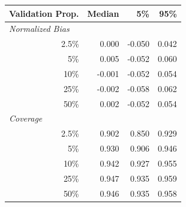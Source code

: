 
\begin{tabular}{r|rrr}
\toprule
Validation Prop. & Median & 5\% & 95\%\\
\midrule
\multicolumn{1}{l|}{\textit{Normalized Bias}}\\
2.5\% & 0.000 & -0.050 & 0.042\\
5\% & 0.005 & -0.052 & 0.060\\
10\% & -0.001 & -0.052 & 0.054\\
25\% & -0.002 & -0.058 & 0.062\\
50\% & 0.002 & -0.052 & 0.054\\
\midrule
%
\multicolumn{1}{l|}{\textit{Coverage}}\\
2.5\% & 0.902 & 0.850 & 0.929\\
5\% & 0.930 & 0.906 & 0.946\\
10\% & 0.942 & 0.927 & 0.955\\
25\% & 0.947 & 0.935 & 0.959\\
50\% & 0.946 & 0.935 & 0.958\\
\bottomrule
\end{tabular}
